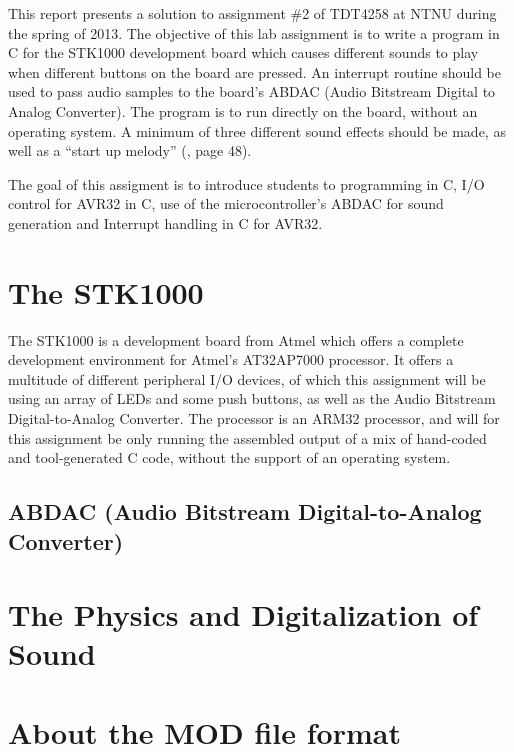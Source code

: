 This report presents a solution to assignment \#2 of TDT4258 at NTNU during the spring of 2013.
The objective of this lab assignment is to write a program in C for the STK1000 development board which causes different sounds to play when different buttons on the board are pressed.
An interrupt routine should be used to pass audio samples to the board's ABDAC (Audio Bitstream Digital to Analog Converter).
The program is to run directly on the board, without an operating system.
A minimum of three different sound effects should be made, as well as a ``start up melody'' (\cite{lab-compendium}, page 48).

The goal of this assigment is to introduce students to programming in C, I/O control for AVR32 in C, use of the microcontroller's ABDAC for sound generation and Interrupt handling in C for AVR32.

\section{The STK1000}
	The STK1000 is a development board from Atmel which offers a complete development environment for Atmel's AT32AP7000 processor.
	It offers a multitude of different peripheral I/O devices, of which this assignment will be using an array of LEDs and some push buttons, as well as the Audio Bitstream Digital-to-Analog Converter.
	The processor is an ARM32 processor, and will for this assignment be only running the assembled output of a mix of hand-coded and tool-generated C code, without the support of an operating system.

\subsection{ABDAC (Audio Bitstream Digital-to-Analog Converter)}
	

\section{The Physics and Digitalization of Sound}
	

\section{About the MOD file format}
	

